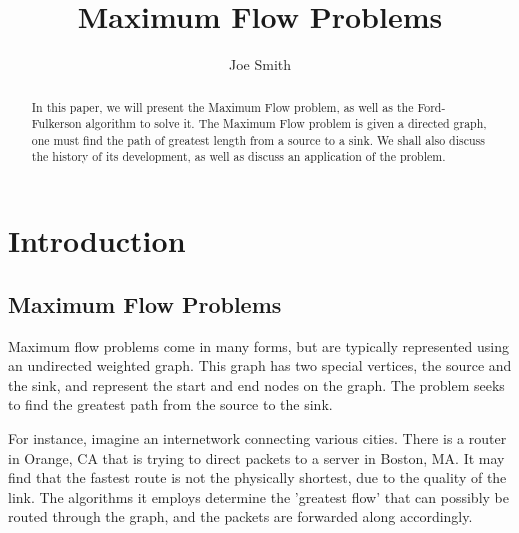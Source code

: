 \documentclass[a4paper,11pt, twocolumn]{article}
\author{Joe Smith}
\title{Maximum Flow Problems}
\begin{document}
\maketitle

\begin{abstract}
In this paper, we will present the Maximum Flow problem, as well as the Ford-Fulkerson algorithm to solve it. The Maximum Flow problem is given a directed graph, one must find the path of greatest length from a source to a sink. We shall also discuss the history of its development, as well as discuss an application of the problem.
\end{abstract}

\section{Introduction}
\subsection{Maximum Flow Problems}
Maximum flow problems come in many forms, but are typically represented using an undirected weighted graph. This graph has two special vertices, the source and the sink, and represent the start and end nodes on the graph. The problem seeks to find the greatest path from the source to the sink.

For instance, imagine an internetwork connecting various cities. There is a router in Orange, CA that is trying to direct packets to a server in Boston, MA. It may find that the fastest route is not the physically shortest, due to the quality of the link. The algorithms it employs determine the 'greatest flow' that can possibly be routed through the graph, and the packets are forwarded along accordingly.
\end{document}
